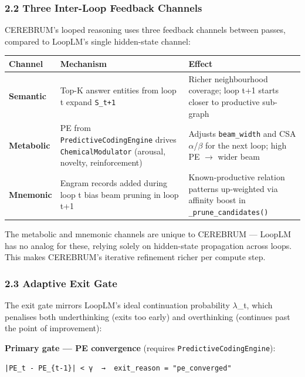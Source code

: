\subsubsection{2.2 Three Inter-Loop Feedback Channels}

CEREBRUM's looped reasoning uses three feedback channels between passes, compared to LoopLM's single hidden-state channel:

\begin{center}
{\footnotesize
\begin{tabularx}{\columnwidth}{|>{\raggedright\arraybackslash}X|>{\raggedright\arraybackslash}X|>{\raggedright\arraybackslash}X|}
\hline
Channel & Mechanism & Effect \\ \hline
\textbf{Semantic} & Top-K answer entities from loop t expand \texttt{S\_{t+1}} & Richer neigh\-bourhood coverage; loop t+1 starts closer to productive sub-graph \\ \hline
\textbf{Metabolic} & PE from \texttt{PredictiveCodingEngine} drives \texttt{ChemicalModulator} (arousal, novelty, reinf\-orcement) & Adjusts \texttt{beam\_width} and CSA $\alpha$/$\beta$ for the next loop; high PE $\to$ wider beam \\ \hline
\textbf{Mnemonic} & Engram records added during loop t bias beam pruning in loop t+1 & Known-productive relation patterns up-weighted via affinity boost in \texttt{\_prune\_candidates()} \\ \hline
\end{tabularx}
}
\end{center}

The metabolic and mnemonic channels are unique to CEREBRUM — LoopLM has no analog for these, relying solely on hidden-state propagation across loops. This makes CEREBRUM's iterative refinement richer per compute step.

\subsubsection{2.3 Adaptive Exit Gate}

The exit gate mirrors LoopLM's ideal conti\-nuation probability $\lambda$\_t, which penalises both under\-thinking (exits too early) and overt\-hinking (continues past the point of improvement):

\textbf{Primary gate — PE convergence} (requires \texttt{PredictiveCodingEngine}):
\begin{lstlisting}
|PE_t - PE_{t-1}| < γ  →  exit_reason = "pe_converged"
\end{lstlisting}


